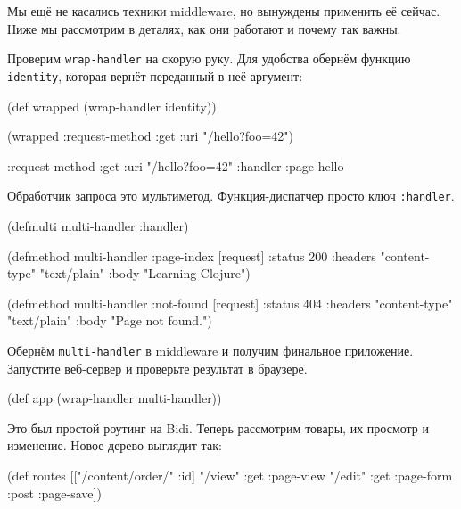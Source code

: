 Мы ещё не касались техники middleware, но вынуждены применить её сейчас. Ниже мы
рассмотрим в деталях, как они работают и почему так важны.

Проверим \verb|wrap-handler| на скорую руку. Для удобства обернём функцию
\verb|identity|, которая вернёт переданный в неё аргумент:

\begin{english}
  \begin{clojure}
(def wrapped (wrap-handler identity))

(wrapped {:request-method :get
          :uri "/hello?foo=42"})

{:request-method :get
 :uri "/hello?foo=42"
 :handler :page-hello}
  \end{clojure}
\end{english}


Обработчик запроса это мультиметод. Функция-диспатчер просто ключ
\verb|:handler|.

\begin{english}
  \begin{clojure}
(defmulti multi-handler :handler)

(defmethod multi-handler :page-index
  [request]
  {:status 200
   :headers {"content-type" "text/plain"}
   :body "Learning Clojure"})

(defmethod multi-handler :not-found
  [request]
  {:status 404
   :headers {"content-type" "text/plain"}
   :body "Page not found."})
  \end{clojure}
\end{english}

Обернём \verb|multi-handler| в middleware и получим финальное
приложение. Запустите веб-сервер и проверьте результат в браузере.

\begin{english}
  \begin{clojure}
(def app (wrap-handler multi-handler))
  \end{clojure}
\end{english}

Это был простой роутинг на Bidi. Теперь рассмотрим товары, их
просмотр и изменение. Новое дерево выглядит так:

\begin{english}
  \begin{clojure}
(def routes
  [["/content/order/" :id] {"/view" {:get  :page-view}
                            "/edit" {:get  :page-form
                                     :post :page-save}}])
  \end{clojure}
\end{english}

